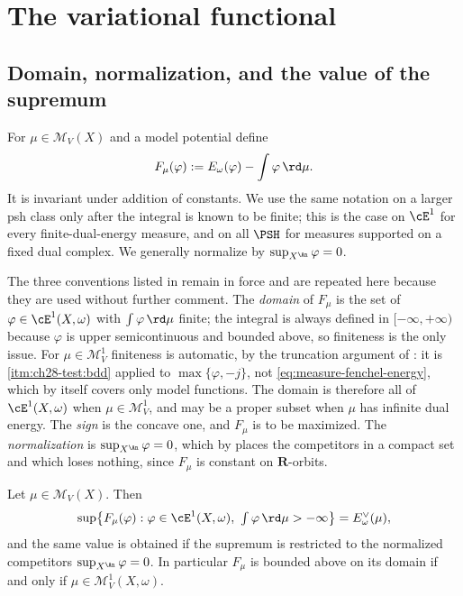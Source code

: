 \section{The variational functional}
\label{sec:ch28-variational}

\subsection{Domain, normalization, and the value of the supremum}
\label{sec:ch28-domain}

For $\mu\in\mathcal M_V(X)$ and a model potential define
\begin{equation}
\label{eq:variational-functional}
                  F_\mu(\varphi)
                  :=E_\omega(\varphi)-\int\varphi\,\rd \mu.
\end{equation}
It is invariant under addition of constants.  We use the same notation on a
larger psh class only after the integral is known to be finite; this is the
case on $\cE^1$ for every finite-dual-energy measure, and on all
$\PSH$ for measures supported on a fixed dual complex.  We generally
normalize by $\sup_{X^{\An}}\varphi=0$.

The three conventions listed in 
remain in force and are repeated here because they are used without further
comment.  The \emph{domain} of $F_\mu$ is the set of
$\varphi\in\cE^1(X,\omega)$ with $\int\varphi\,\rd\mu$ finite; the
integral is always defined in $[-\infty,+\infty)$ because $\varphi$ is
upper semicontinuous and bounded above, so finiteness is the only issue.
For $\mu\in\mathcal M^1_V$ finiteness is automatic, by the truncation
argument of : it is
\,\cref{itm:ch28-test:bdd} applied to
$\max\{\varphi,-j\}$, not \eqref{eq:measure-fenchel-energy}, which by
itself covers only model functions.  The domain is therefore all of
$\cE^1(X,\omega)$ when $\mu\in\mathcal M^1_V$, and may be a proper subset
when $\mu$ has infinite dual energy.  The
\emph{sign} is the concave one, and $F_\mu$ is to be maximized.  The
\emph{normalization} is $\sup_{X^{\An}}\varphi=0$, which by
 places the competitors in a compact set and
which loses nothing, since $F_\mu$ is constant on
$\mathbf R$-orbits.

\begin{proposition}
\label{prop:ch28-sup-is-dual-energy}
Let $\mu\in\mathcal M_V(X)$.  Then
\begin{equation}
\label{eq:ch28-sup-is-dual-energy}
 \sup\bigl\{F_\mu(\varphi):\varphi\in\cE^1(X,\omega),\
   \textstyle\int\varphi\,\rd\mu>-\infty\bigr\}
 =E^\vee_\omega(\mu),
\end{equation}
and the same value is obtained if the supremum is restricted to the
normalized competitors $\sup_{X^{\An}}\varphi=0$.  In particular $F_\mu$
is bounded above on its domain if and only if
$\mu\in\mathcal M^1_V(X,\omega)$.
\end{proposition}

